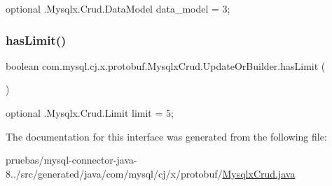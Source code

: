 {\ttfamily optional .Mysqlx.\+Crud.\+Data\+Model data\+\_\+model = 3;} \mbox{\label{interfacecom_1_1mysql_1_1cj_1_1x_1_1protobuf_1_1_mysqlx_crud_1_1_update_or_builder_acdc185b89f13b9925d0c43b9533be669}} 
\subsubsection{\texorpdfstring{has\+Limit()}{hasLimit()}}
{\footnotesize\ttfamily boolean com.\+mysql.\+cj.\+x.\+protobuf.\+Mysqlx\+Crud.\+Update\+Or\+Builder.\+has\+Limit (\begin{DoxyParamCaption}{ }\end{DoxyParamCaption})}

{\ttfamily optional .Mysqlx.\+Crud.\+Limit limit = 5;} 

The documentation for this interface was generated from the following file\+:\begin{DoxyCompactItemize}
\item 
pruebas/mysql-\/connector-\/java-\/8../src/generated/java/com/mysql/cj/x/protobuf/\mbox{\hyperlink{_mysqlx_crud_8java}{Mysqlx\+Crud.\+java}}\end{DoxyCompactItemize}
